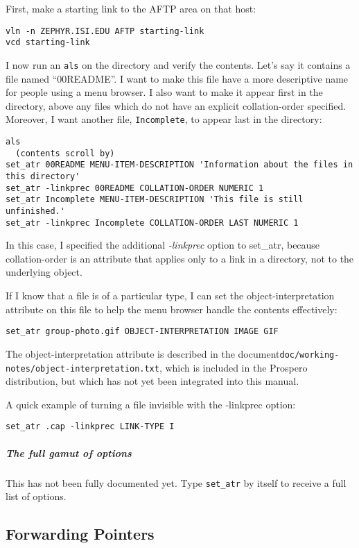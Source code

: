 First, make a starting link to the AFTP area on that host:
\begin{verbatim}
vln -n ZEPHYR.ISI.EDU AFTP starting-link
vcd starting-link
\end{verbatim}
I now run an {\tt als} on the directory and verify the contents.
Let's say it contains a file named ``00README''.  I want to make this
file have a more descriptive name for people using a menu browser.  I
also want to make it appear first in the directory, above any
files which do not have an explicit {\sc collation-order} specified.
Moreover, I want another file, {\tt Incomplete}, to appear last in the
directory:
\begin{verbatim}
als
  (contents scroll by)
set_atr 00README MENU-ITEM-DESCRIPTION 'Information about the files in this directory'
set_atr -linkprec 00README COLLATION-ORDER NUMERIC 1
set_atr Incomplete MENU-ITEM-DESCRIPTION 'This file is still unfinished.'
set_atr -linkprec Incomplete COLLATION-ORDER LAST NUMERIC 1
\end{verbatim}
In this case, I specified the additional {\em -linkprec} option to
set\_atr, because {\sc collation-order} is an attribute that applies
only to a link in a directory, not to the underlying object.

If I know that a file is of a particular type, I can set the {\sc
object-interpretation} attribute on this file to help the menu browser
handle the contents effectively:
\begin{verbatim}
set_atr group-photo.gif OBJECT-INTERPRETATION IMAGE GIF
\end{verbatim}
\begin{sloppy}
The {\sc object-interpretation} attribute is described in the document\linebreak[4]
\mbox{{\tt doc/working-notes/object-interpretation.txt}}, which is included
in the Prospero distribution, but which has not yet been integrated
into this manual.
\end{sloppy}
A quick example of turning a file invisible with the -linkprec option:
\begin{verbatim}
set_atr .cap -linkprec LINK-TYPE I
\end{verbatim}

\subparagraph{The full gamut of options}

This has not been fully documented yet.  Type {\tt set\_atr} by itself
to receive a full list of options.

\subsection{Forwarding Pointers}

